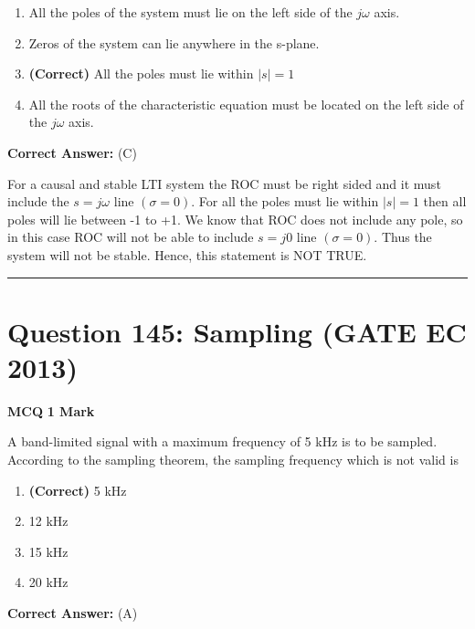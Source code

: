 \documentclass[11pt,a4paper]{article}
\begin{document}
\begin{enumerate}[label=(\Alph*)]
    \item All the poles of the system must lie on the left side of the $j\omega$ axis.
    \item Zeros of the system can lie anywhere in the s-plane.
    \item \textbf{(Correct)} All the poles must lie within $\left | s \right |=1$
    \item All the roots of the characteristic equation must be located on the left side of the $j\omega$ axis.
\end{enumerate}

\noindent \textbf{Correct Answer:} (C)

\begin{tcolorbox}[solbox, title=Detailed Solution -- Question 144]
For a causal and stable LTI system the ROC must be right sided and it must include the $s=j \omega$ line $(\sigma=0)$. For all the poles must lie within $|s|=1$ then all poles will lie between -1 to +1.
 We know that ROC does not include any pole, so in this case ROC will not be able to include $s= j0$  line $(\sigma=0) .$ Thus the system will not be stable. Hence,
this statement is NOT TRUE.
\end{tcolorbox}

\vspace{1.5em}
\hrule
\vspace{1.5em}

\section*{Question 145: Sampling (GATE EC 2013)}
\noindent \textbf{\color{primary}MCQ} \hfill \textbf{\color{secondary}1 Mark}


\noindent A band-limited signal with a maximum frequency of 5 kHz is to be sampled. According to the sampling theorem, the sampling frequency which is not valid is


\begin{enumerate}[label=(\Alph*)]
    \item \textbf{(Correct)} 5 kHz
    \item 12 kHz
    \item 15 kHz
    \item 20 kHz
\end{enumerate}

\noindent \textbf{Correct Answer:} (A)
\end{document}
